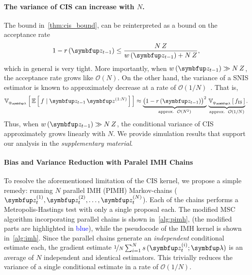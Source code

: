 \vspace{-0.1in}
\paragraph{The variance of CIS can increase with \(N\).}
The bound in~\cref{thm:cis_bound}, can be reinterpreted as a bound on the acceptance rate 
\begin{align}
  1 - r\,(\vz_{t-1}) \leq \frac{N\,Z}{ w\,(\vz_{t-1}) + N\,Z},
\end{align}
which in general is very tight.
More importantly, when \(w\,(\vz_{t-1}) \gg N\,Z\), the acceptance rate grows like \(\mathcal{O}(N)\).
On the other hand, the variance of a SNIS estimator is known to approximately decrease at a rate of \(\mathcal{O}(1/N)\)~\citep{kong_sequential_1994, robert_monte_2004, elvira_rethinking_2018}.
That is, 
\begin{align}
  \Vsub{q_{\vlambda}}{ \E{ f \mid \vz_{t-1}\,\vz^{(1:N)} } } \approx \underbrace{{\big(1 - r\,(\vz_{t-1})\big)}^2}_{\text{approx.}\;\;\mathcal{O}(N^2)} \,
  \underbrace{\Vsub{q_{\vlambda}}{ f_{\text{IS}} }}_{\text{approx.}\;\;\mathcal{O}(1/N)}.\label{eq:cis_variance_incr}
\end{align}
Thus, when \(w\,(\vz_{t-1})\gg N\,Z\), the conditional variance of CIS approximately grows linearly with \(N\).
We provide simulation results that support our analysis in the \textit{supplementary material}.

\vspace{-0.1in}
\paragraph{Bias and Variance Reduction with Paralel IMH Chains}
To resolve the aforementioned limitation of the CIS kernel, we propose a simple remedy: running \(N\) parallel IMH (PIMH) Markov-chains (\(\vz_t^{(1)}, \vz_t^{(2)}, \ldots, \vz_t^{(N)}\)).
Each of the chains performs a Metropolis-Hastings test with only a single proposal each.
The modified MSC algorithm incorporating parallel chains is shown in~\cref{alg:pimh}, (the modified parts are highlighted in \textcolor{blue}{blue}), while the pseudocode of the IMH kernel is shown in~\cref{alg:imh}.
Since the parallel chains generate an \textit{independent} conditional estimate each, the gradient estimate \(\nicefrac{1}{N} \sum^{N}_{i=1} s\,(\vz_t^{(i)}; \vlambda)\) is an average of \(N\) independent and identical estimators.
This trivially reduces the variance of a single conditional estimate in a rate of \(\mathcal{O}(1/N)\).
%
%

